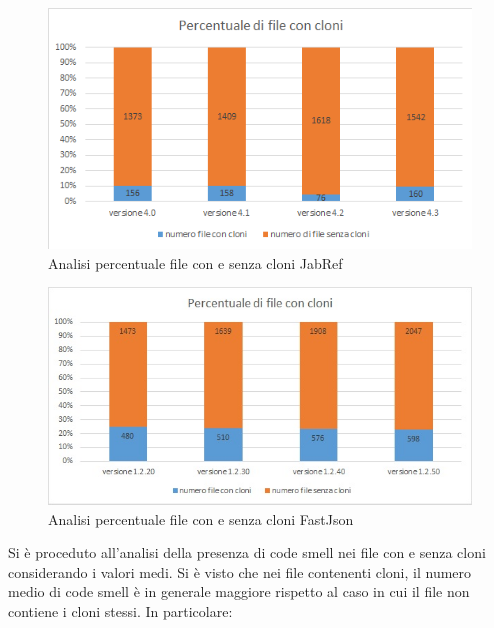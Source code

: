 \begin{figure}[h]
	\centering
	\includegraphics[scale=0.7, trim = 0cm 0cm 0cm 0cm, clip=true]{Grafici_jabRef/PercentualeFileCloni.png}
	\caption{Analisi percentuale file con e senza cloni JabRef}
	\label{fig:percentualeJabRef}
\end{figure}
\begin{figure}[h]
	\centering
	\includegraphics[scale=0.7, trim = 0cm 0cm 0cm 0cm, clip=true]{Grafici_fastJson/PercentualeFileConCloni.jpg}
	\caption{Analisi percentuale file con e senza cloni FastJson}
	\label{fig:percentualeFastjson}
\end{figure}
Si è proceduto all'analisi della presenza di code smell nei file con e senza cloni considerando i valori medi. Si è visto che nei file contenenti cloni, il numero medio di code smell è in generale maggiore rispetto al caso in cui il file non contiene i cloni stessi. In particolare:
